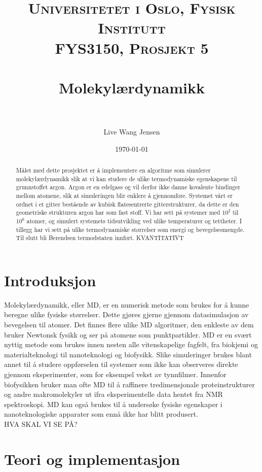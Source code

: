 \documentclass[paper=a4, fontsize=11pt]{scrartcl} %
\title{	
\normalfont \normalsize 
\textsc{Universitetet i Oslo, Fysisk Institutt \\
										FYS3150, Prosjekt 5} \\ [25pt] %
\horrule{0.5pt} \\[0.4cm] %
\huge Molekylærdynamikk \\ %
\horrule{2pt} \\[0.5cm] %
}
\author{Live Wang Jensen} %
\date{\normalsize\today} %
\numberwithin{equation}{section} %
\numberwithin{figure}{section} %
\numberwithin{table}{section} %
\begin{document}
\maketitle 
\begin{abstract}
Målet med dette prosjektet er å implementere en algoritme som simulerer molekylærdynamikk slik at vi kan studere de ulike termodynamiske egenskapene til grunnstoffet argon. Argon er en edelgass og vil derfor ikke danne kovalente bindinger mellom atomene, slik at simuleringen blir enklere å gjennomføre. Systemet vårt er ordnet i et gitter bestående av kubisk flatesentrerte gitterstrukturer, da dette er den geometriske strukturen argon har som fast stoff. Vi har sett på systemer med $10^2$ til $10^6$ atomer, og simulert systemets tidsutvikling ved ulike temperaturer og tettheter. I tillegg har vi sett på ulike termodynamiske størrelser som energi og bevegelsesmengde. Til slutt bli Berendsen termodstaten innført.
KVANTITATIVT

\end{abstract}

\tableofcontents


\section{Introduksjon}
Molekylærdynamikk, eller MD, er en numerisk metode som brukes for å kunne beregne ulike fysiske størrelser. Dette gjøres gjerne gjennom datasimulasjon av bevegelsen til atomer. Det finnes flere ulike MD algoritmer, den enkleste av dem bruker Newtonsk fysikk og ser på atomene som punktpartikler. MD er en svært nyttig metode som brukes innen nesten alle vitenskapelige fagfelt, fra biokjemi og materialteknologi til nanoteknologi og biofysikk. Slike simuleringer brukes blant annet til å studere oppførselen til systemer som ikke kan observeres direkte gjennom eksperimenter, som for eksempel vekst av tynnfilmer. Innenfor biofysikken bruker man ofte MD til å raffinere tredimensjonale proteinstrukturer og andre makromolekyler ut ifra eksperimentelle data hentet fra NMR spektroskopi. MD kan også brukes til å undersøke fysiske egenskaper i nanoteknologiske apparater som ennå ikke har blitt produsert. 
\\
HVA SKAL VI SE PÅ?




\section{Teori og implementasjon}
\end{document}

